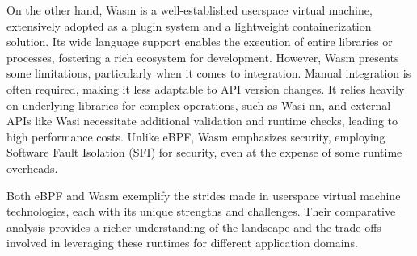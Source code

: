 On the other hand, Wasm is a well-established userspace virtual machine, extensively adopted as a plugin system and a lightweight containerization solution. Its wide language support enables the execution of entire libraries or processes, fostering a rich ecosystem for development. However, Wasm presents some limitations, particularly when it comes to integration. Manual integration is often required, making it less adaptable to API version changes. It relies heavily on underlying libraries for complex operations, such as Wasi-nn, and external APIs like Wasi necessitate additional validation and runtime checks, leading to high performance costs. Unlike eBPF, Wasm emphasizes security, employing Software Fault Isolation (SFI) for security, even at the expense of some runtime overheads.

Both eBPF and Wasm exemplify the strides made in userspace virtual machine technologies, each with its unique strengths and challenges. Their comparative analysis provides a richer understanding of the landscape and the trade-offs involved in leveraging these runtimes for different application domains.